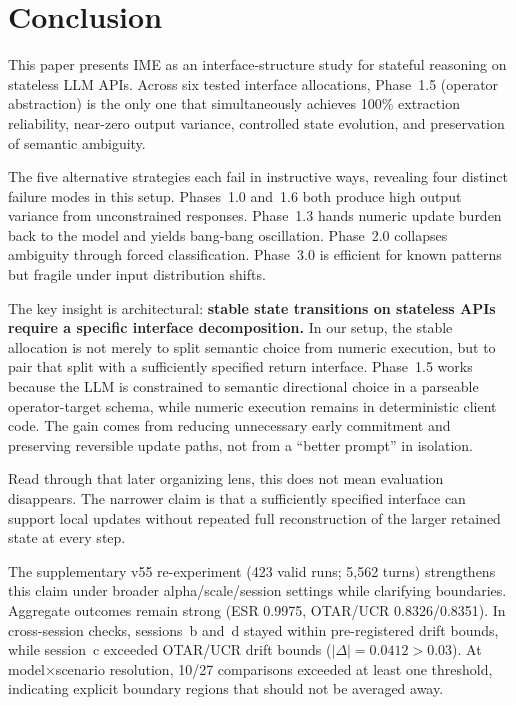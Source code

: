 \documentclass[11pt,a4paper]{article}
\begin{document}
\section{Conclusion}
\label{sec:conclusion}

This paper presents IME as an interface-structure study for stateful reasoning
on stateless LLM APIs. Across six tested interface allocations, Phase~1.5
(operator abstraction) is the only one that simultaneously achieves 100\%
extraction reliability, near-zero output variance, controlled state evolution,
and preservation of semantic ambiguity.

The five alternative strategies each fail in instructive ways, revealing four
distinct failure modes in this setup. Phases~1.0 and~1.6 both produce high
output variance from unconstrained responses. Phase~1.3 hands numeric update
burden back to the model and yields bang-bang oscillation. Phase~2.0 collapses
ambiguity through forced classification. Phase~3.0 is efficient for known
patterns but fragile under input distribution shifts.

The key insight is architectural: \textbf{stable state transitions on stateless
APIs require a specific interface decomposition.} In our setup, the stable
allocation is not merely to split semantic choice from numeric execution, but
to pair that split with a sufficiently specified return interface. Phase~1.5
works because the LLM is constrained to semantic directional choice in a
parseable operator-target schema, while numeric execution remains in
deterministic client code. The gain comes from reducing unnecessary early
commitment and preserving reversible update paths, not from a ``better prompt''
in isolation.

Read through that later organizing lens, this does not mean evaluation disappears.
The narrower claim is that a sufficiently specified interface can support local
updates without repeated full reconstruction of the larger retained state at every
step.

The supplementary v55 re-experiment (423 valid runs; 5{,}562 turns) strengthens
this claim under broader alpha/scale/session settings while clarifying
boundaries. Aggregate outcomes remain strong (ESR 0.9975, OTAR/UCR
0.8326/0.8351). In cross-session checks, sessions~b and~d stayed within
pre-registered drift bounds, while session~c exceeded OTAR/UCR drift bounds
($|\Delta|=0.0412 > 0.03$). At model$\times$scenario resolution, 10/27
comparisons exceeded at least one threshold, indicating explicit boundary
regions that should not be averaged away.
\end{document}
